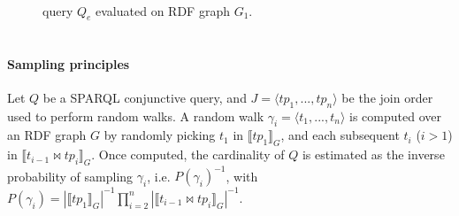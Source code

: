 

\begin{figure}[t]
  \centering
  \begin{minipage}{0.49\textwidth}
    \subfloat[$(Q_e$]{
      
      \label{fig:q1-j2-1hop}
    } \\
  \end{minipage}
  \hfill
  \begin{minipage}{0.50\textwidth}
  \end{minipage}
  \caption{
    query $Q_e$  evaluated on RDF graph $G_1$.
  }
  \label{fig:random_walks_example}
\end{figure}



\section{\NAME}


\paragraph{Sampling principles}


Let $Q$ be a SPARQL conjunctive query, and $J = \langle tp_1, ..., tp_n \rangle$ be
the join order used to perform random walks. A random walk
$\gamma_i = \langle t_1, ..., t_n\rangle$ is computed over
an RDF graph $G$ by randomly picking $t_1$ in $\llbracket tp_1 \rrbracket_G$,
and each subsequent $t_i$ ($i > 1$) in $\llbracket t_{i-1} \bowtie tp_i \rrbracket_G$.
Once computed, the cardinality of $Q$ is estimated as the inverse probability
of sampling $\gamma_i$, i.e. $P(\gamma_i)^{-1}$, with $P(\gamma_i) = |\llbracket tp_1 \rrbracket_G|^{-1} \prod_{i=2}^{n}
|\llbracket t_{i-1} \bowtie tp_i \rrbracket_G|^{-1}$.

